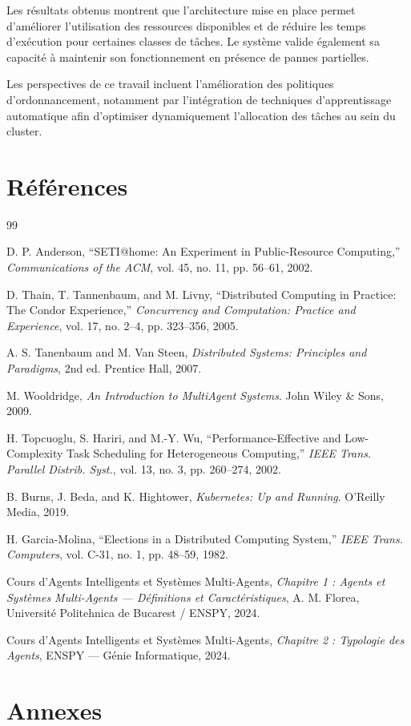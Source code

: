 \documentclass[12pt,a4paper]{report}
\begin{document}
Les résultats obtenus montrent que l’architecture mise en place permet d’améliorer l’utilisation des ressources disponibles et de réduire les temps d’exécution pour certaines classes de tâches. Le système valide également sa capacité à maintenir son fonctionnement en présence de pannes partielles.

Les perspectives de ce travail incluent l’amélioration des politiques d’ordonnancement, notamment par l’intégration de techniques d’apprentissage automatique afin d’optimiser dynamiquement l’allocation des tâches au sein du cluster.

\section*{Références}

\begin{thebibliography}{99}

D. P. Anderson, ``SETI@home: An Experiment in Public-Resource Computing,''
\textit{Communications of the ACM}, vol. 45, no. 11, pp. 56--61, 2002.

D. Thain, T. Tannenbaum, and M. Livny,
``Distributed Computing in Practice: The Condor Experience,''
\textit{Concurrency and Computation: Practice and Experience}, vol. 17, no. 2--4, pp. 323--356, 2005.

A. S. Tanenbaum and M. Van Steen,
\textit{Distributed Systems: Principles and Paradigms}, 2nd ed. Prentice Hall, 2007.

M. Wooldridge,
\textit{An Introduction to MultiAgent Systems}. John Wiley \& Sons, 2009.

H. Topcuoglu, S. Hariri, and M.-Y. Wu,
``Performance-Effective and Low-Complexity Task Scheduling for Heterogeneous Computing,''
\textit{IEEE Trans. Parallel Distrib. Syst.}, vol. 13, no. 3, pp. 260--274, 2002.

B. Burns, J. Beda, and K. Hightower,
\textit{Kubernetes: Up and Running}. O'Reilly Media, 2019.

H. Garcia-Molina,
``Elections in a Distributed Computing System,''
\textit{IEEE Trans. Computers}, vol. C-31, no. 1, pp. 48--59, 1982.

Cours d'Agents Intelligents et Systèmes Multi-Agents,
\textit{Chapitre 1 : Agents et Systèmes Multi-Agents — Définitions et Caractéristiques},
A. M. Florea, Université Politehnica de Bucarest / ENSPY, 2024.

Cours d'Agents Intelligents et Systèmes Multi-Agents,
\textit{Chapitre 2 : Typologie des Agents},
ENSPY — Génie Informatique, 2024.

\end{thebibliography}

\section*{Annexes}
\end{document}
